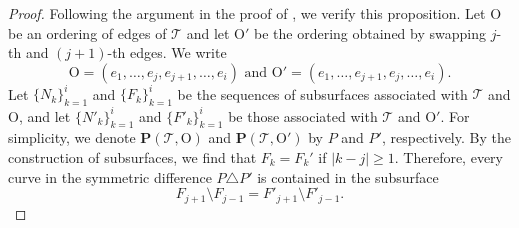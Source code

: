 \documentclass[a4paper,11pt]{amsart}
\numberwithin{equation}{section}
\theoremstyle{definition}
\begin{document}
\begin{proof}
    Following the argument in the proof of \cite[Lemma 3.18]{lackenby2024bounds}, we verify this proposition.
    Let $\mathrm{O}$ be an ordering of edges of $\mathcal{T}$ and let $\mathrm{O}'$ be the ordering obtained by swapping $j$-th and $(j+1)$-th edges.
    We write
    \begin{equation*}
        \mathrm{O}=(e_1,\ldots,e_j,e_{j+1},\ldots,e_i) \text{ and } 
        \mathrm{O}'=(e_1,\ldots,e_{j+1},e_{j},\ldots,e_i).
    \end{equation*}
    Let $\{N_k\}_{k=1}^i$ and $\{F_k\}_{k=1}^i$ be the sequences of subsurfaces associated with $\mathcal{T}$ and $\mathrm{O}$, and let $\{N'_k\}_{k=1}^i$ and $\{F'_k\}_{k=1}^i$ be those associated with $\mathcal{T}$ and $\mathrm{O}'$.
    For simplicity, we denote $\mathbf{P}(\mathcal{T},\mathrm{O})$ and $\mathbf{P}(\mathcal{T},\mathrm{O}')$ by $P$ and $P'$, respectively.
    By the construction of subsurfaces, we find that $F_k=F_k'$ if $|k-j|\geq 1$.
    Therefore, every curve in the symmetric difference $P \triangle P'$ is contained in the subsurface
    \begin{equation*}
        F_{j+1}\setminus F_{j-1}=F'_{j+1}\setminus F'_{j-1}.
    \end{equation*}


\end{proof}
\end{document}
